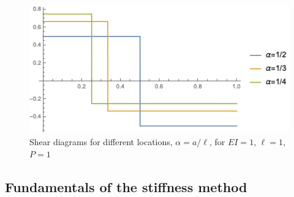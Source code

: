\documentclass[11pt, oneside]{article}   	%
\begin{document}
\begin{figure}[htbp]
    \begin{center}
        \includegraphics[]{forceShear.png}
        \caption{Shear diagrams for different locations, $\alpha=a/\ell$, for $EI=1$, $\ell=1$, $P=1$}
        \label{default4}
    \end{center}
\end{figure}

\subsection{Fundamentals of the stiffness method}
\end{document}
